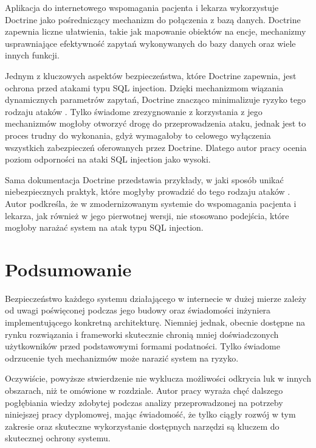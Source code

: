 \documentclass[12pt,oneside]{book}
\begin{document}
    Aplikacja do internetowego wspomagania pacjenta i lekarza wykorzystuje Doctrine jako pośredniczący mechanizm do połączenia z bazą danych. Doctrine zapewnia liczne ułatwienia, takie jak mapowanie obiektów na encje, mechanizmy usprawniające efektywność zapytań wykonywanych do bazy danych oraz wiele innych funkcji.

    Jednym z kluczowych aspektów bezpieczeństwa, które Doctrine zapewnia, jest ochrona przed atakami typu SQL injection. Dzięki mechanizmom wiązania dynamicznych parametrów zapytań, Doctrine znacząco minimalizuje ryzyko tego rodzaju ataków \cite{doctrine.orm}. Tylko świadome zrezygnowanie z korzystania z jego mechanizmów mogłoby otworzyć drogę do przeprowadzenia ataku, jednak jest to proces trudny do wykonania, gdyż wymagałoby to celowego wyłączenia wszystkich zabezpieczeń oferowanych przez Doctrine. Dlatego autor pracy ocenia poziom odporności na ataki SQL injection jako wysoki.

    Sama dokumentacja Doctrine przedstawia przykłady, w jaki sposób unikać niebezpiecznych praktyk, które mogłyby prowadzić do tego rodzaju ataków \cite{doctrine.security}. Autor podkreśla, że w zmodernizowanym systemie do wspomagania pacjenta i lekarza, jak również w jego pierwotnej wersji, nie stosowano podejścia, które mogłoby narażać system na atak typu SQL injection.


    \section{Podsumowanie}
    Bezpieczeństwo każdego systemu działającego w internecie w dużej mierze zależy od uwagi poświęconej podczas jego budowy oraz świadomości inżyniera implementującego konkretną architekturę. Niemniej jednak, obecnie dostępne na rynku rozwiązania i frameworki skutecznie chronią mniej doświadczonych użytkowników przed podstawowymi formami podatności. Tylko świadome odrzucenie tych mechanizmów może narazić system na ryzyko.

    Oczywiście, powyższe stwierdzenie nie wyklucza możliwości odkrycia luk w innych obszarach, niż te omówione w rozdziale. Autor pracy wyraża chęć dalszego pogłębiania wiedzy zdobytej podczas analizy przeprowadzonej na potrzeby niniejszej pracy dyplomowej, mając świadomość, że tylko ciągły rozwój w tym zakresie oraz skuteczne wykorzystanie dostępnych narzędzi są kluczem do skutecznej ochrony systemu.


    
    
    \listoffigures
    \listoftables
    \lstlistoflistings
\end{document}
